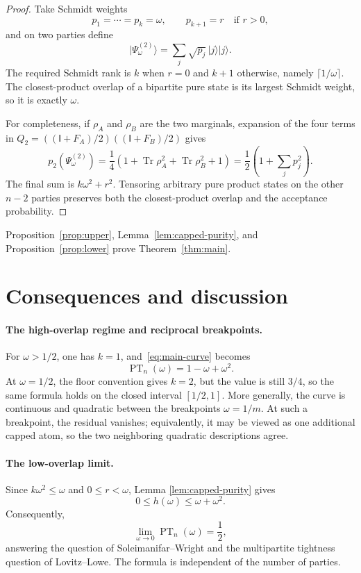 \documentclass[11pt]{article}
\theoremstyle{definition}
\theoremstyle{remark}
\newcommand{\id}{\mathsf{I}}
\newcommand{\Tr}{\operatorname{Tr}}
\newcommand{\PT}{\operatorname{PT}}
\newcommand{\ket}[1]{\lvert #1\rangle}
\begin{document}
\begin{proof}
Take Schmidt weights
\[
  p_1=\cdots=p_k=\omega,
  \qquad p_{k+1}=r\quad\text{if }r>0,
\]
and on two parties define
\[
  \ket{\Psi_\omega^{(2)}}=\sum_j\sqrt{p_j}\,\ket j\ket j.
\]
The required Schmidt rank is $k$ when $r=0$ and $k+1$ otherwise, namely
$\lceil1/\omega\rceil$.  The closest-product overlap of a bipartite pure
state is its largest Schmidt weight, so it is exactly $\omega$.

For completeness, if $\rho_A$ and $\rho_B$ are the two marginals, expansion
of the four terms in
$Q_2=((\id+F_A)/2)((\id+F_B)/2)$ gives
\[
  p_2(\Psi_\omega^{(2)})
  =\frac14\left(1+\Tr\rho_A^2+\Tr\rho_B^2+1\right)
  =\frac12\left(1+\sum_jp_j^2\right).
\]
The final sum is $k\omega^2+r^2$.  Tensoring arbitrary pure product states
on the other $n-2$ parties preserves both the closest-product overlap and
the acceptance probability.
\end{proof}

Proposition~\ref{prop:upper}, Lemma~\ref{lem:capped-purity}, and
Proposition~\ref{prop:lower} prove Theorem~\ref{thm:main}.

\section{Consequences and discussion}\label{sec:consequences}

\paragraph{The high-overlap regime and reciprocal breakpoints.}
For $\omega>1/2$, one has $k=1$, and~\eqref{eq:main-curve} becomes
\[
  \PT_n(\omega)=1-\omega+\omega^2.
\]
At $\omega=1/2$, the floor convention gives $k=2$, but the value is still
$3/4$, so the same formula holds on the closed interval
$[1/2,1]$.  More generally, the curve is continuous and quadratic between
the breakpoints $\omega=1/m$.  At such a breakpoint, the residual vanishes;
equivalently, it may be viewed as one additional capped atom, so the two
neighboring quadratic descriptions agree.

\paragraph{The low-overlap limit.}
Since $k\omega^2\leq\omega$ and $0\leq r<\omega$, Lemma
\ref{lem:capped-purity} gives
\[
  0\leq h(\omega)\leq\omega+\omega^2.
\]
Consequently,
\[
  \lim_{\omega\to0}\PT_n(\omega)=\frac12,
\]
answering the question of Soleimanifar--Wright and the multipartite
tightness question of Lovitz--Lowe.  The formula is independent of the
number of parties.
\end{document}
